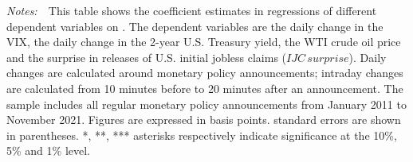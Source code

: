 \documentclass[a4paper,12pt]{article} 		%
\newcommand{\tabnote}[1]{
	\begin{tablenotes}[para,flushleft]
		\footnotesize \emph{Notes:~}~#1
	\end{tablenotes}
}
\newcommand{\textchange}[1]{\iftoggle{revised}{\textcolor{blue}{#1}}{#1}}
\providecommand{\lastobsfx}{November 2021}
\begin{document}
{\begin{normalsize}
\begin{landscape}
\begin{table}[t]
\begin{center}
\begin{threeparttable}
						\tabnote{This table shows the coefficient estimates in regressions of different dependent variables on \textchange{policy rate surprises (PRS)}. \textchange{The surprises are calculated using both intraday and daily data.} The dependent variables are the daily change in the VIX, the daily change in the 2-year U.S. Treasury yield, the WTI crude oil price and the surprise in releases of U.S. initial jobless claims (\(IJC \, surprise\)). Daily changes are calculated around monetary policy announcements; intraday changes are calculated from 10 minutes before to 20 minutes after an announcement. The sample includes all regular monetary policy announcements from January 2011 to \lastobsfx. Figures are expressed in basis points. \textchange{Heteroskedasticity-robust} standard errors are shown in parentheses. *, **, *** asterisks respectively indicate significance at the 10\%, 5\% and 1\% level.}
					\end{threeparttable}
				\end{center}
			\end{table}
		\end{landscape}
	\end{normalsize}
}
\end{document}
